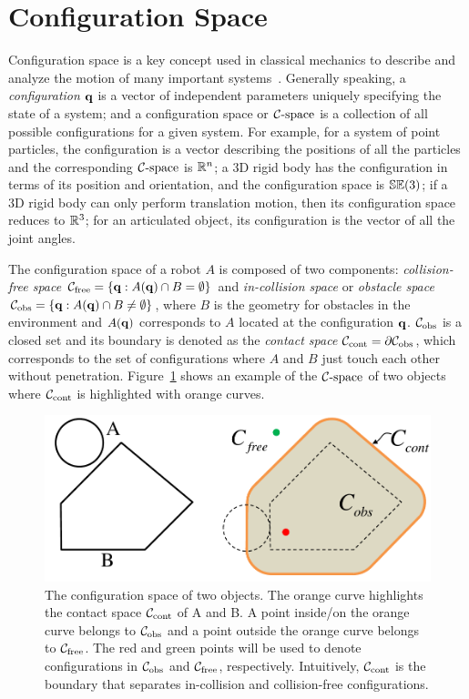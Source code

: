 \section{Configuration Space}
\label{sec:1:configurationSpace}
Configuration space is a key concept used in classical mechanics to describe and analyze the motion of many important systems~\cite{Arnold:1989}. Generally speaking, a \emph{configuration} $\mathbf q$ is a vector of independent parameters uniquely specifying the state of a system; and a configuration space or $\mathcal C\text{-space}$ is a collection of all possible configurations for a given system. For example, for a system of point particles, the configuration is a vector describing the positions of all the particles and the corresponding $\mathcal C\text{-space}$ is $\mathbb R^n$; a 3D rigid body has the configuration in terms of its position and orientation, and the configuration space is $\mathbb {SE}(3)$; if a 3D rigid body can only perform translation motion, then its configuration space reduces to $\mathbb R^3$; for an articulated object, its configuration is the vector of all the joint angles.

The configuration space of a robot $A$ is composed of two components: \emph{collision-free space} $\mathcal C_{\text{free}} = \{\mathbf q: A(\mathbf q) \cap B = \emptyset\}$ and \emph{in-collision space} or \emph{obstacle space} $\mathcal C_{\text{obs}} = \{\mathbf q: A(\mathbf q) \cap B \neq \emptyset\}$, where $B$ is the geometry for obstacles in the environment and $A(\mathbf q)$ corresponds to $A$ located at the configuration $\mathbf q$. $\mathcal C_{\text{obs}}$ is a closed set and its boundary is denoted as the \emph{contact space} $\mathcal C_\text{cont} = \partial \mathcal C_{\text{obs}}$, which corresponds to the set of configurations where $A$ and $B$ just touch each other without penetration. Figure~\ref{fig:1:contactspace} shows an example of the $\mathcal C\text{-space}$ of two objects where $\mathcal C_\text{cont}$ is highlighted with orange curves.

\begin{figure}[htb]
  \centering
  \includegraphics[width=0.6\linewidth]{figs/1/Ccont.pdf}
  \caption[The configuration space of two objects]{The configuration space of two objects. The orange curve highlights the contact space $\mathcal C_\text{cont}$ of A and B. A point inside/on the orange curve belongs to
  $\mathcal C_{\text{obs}}$ and a point outside the orange curve belongs to $\mathcal C_{\text{free}}$.
  The red and green points will be used to denote configurations in $\mathcal C_{\text{obs}}$ and $\mathcal C_{\text{free}}$, respectively. Intuitively, $\mathcal C_\text{cont}$ is the boundary that separates in-collision and collision-free configurations.}
  \label{fig:1:contactspace}
\end{figure}

